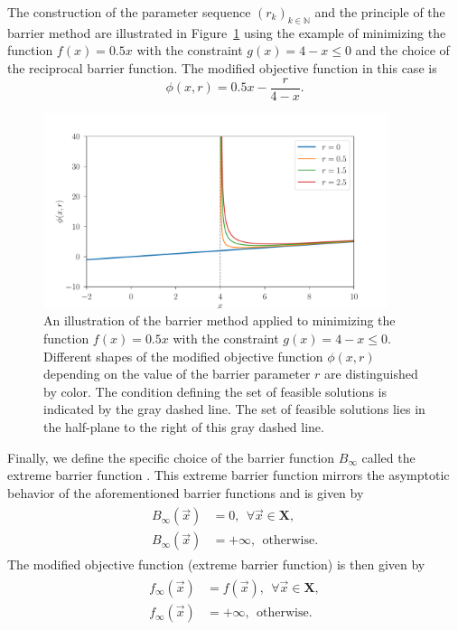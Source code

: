 The construction of the parameter sequence $ (r_k)_{k \in \mathbb{N}} $ and the principle of the barrier method are illustrated in Figure~\ref{fig:barrier} using the example of minimizing the function $ f(x) = 0.5x $ with the constraint $ g(x) = 4 - x \leq 0 $ and the choice of the reciprocal barrier function. The modified objective function in this case is
\begin{equation}
	\phi (x, r) = 0.5x - \frac{r}{4-x}.
\end{equation}

\begin{figure}[H]
	\centering
	\includegraphics[width=0.9\textwidth]{figures/barrier.pdf}
	\caption{An illustration of the barrier method applied to minimizing the function $ f(x) = 0.5x $ with the constraint $ g(x) = 4 - x \leq 0 $. Different shapes of the modified objective function $ \phi (x, r) $ depending on the value of the barrier parameter $ r $ are distinguished by color. The condition defining the set of feasible solutions is indicated by the gray dashed line. The set of feasible solutions lies in the half-plane to the right of this gray dashed line.}
	\label{fig:barrier}
\end{figure}

Finally, we define the specific choice of the barrier function $ B_{\infty} $ called the extreme barrier function \cite{BBO-textbook}. This extreme barrier function mirrors the asymptotic behavior of the aforementioned barrier functions and is given by
\begin{align}
	\begin{split}
		B_{\infty}(\vec{x}) &= 0, \ \ \forall \vec{x} \in \mathbf{X},\\[6pt]
		B_{\infty}(\vec{x}) &= +\infty, \ \ \text{otherwise.}
	\end{split}
\end{align}
The modified objective function (extreme barrier function) is then given by
\begin{align}\label{eq:extreme barrier}
	\begin{split}
		f_{\infty}(\vec{x}) &= f(\vec{x}) , \ \ \forall \vec{x} \in \mathbf{X},\\[6pt]
		f_{\infty}(\vec{x}) &= +\infty, \ \ \text{otherwise.}
	\end{split}
\end{align}